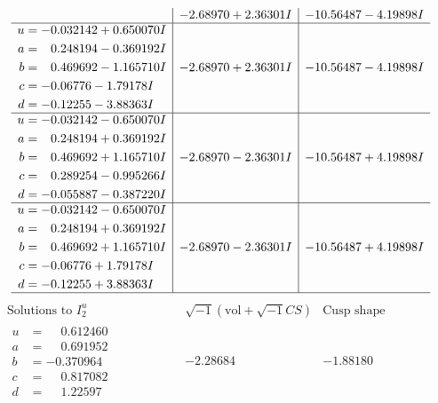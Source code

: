 \documentclass[1p]{elsarticle_modified}
\theoremstyle{definition}
\newcommand{\I}{\sqrt{-1}}
\begin{document}
$$\begin{array}{c|c|c}
 & -2.68970 + 2.36301 I & -10.56487 - 4.19898 I \\ \hline\begin{aligned}
u &= -0.032142 + 0.650070 I \\
a &= \phantom{-}0.248194 - 0.369192 I \\
b &= \phantom{-}0.469692 - 1.165710 I \\
c &= -0.06776 - 1.79178 I \\
d &= -0.12255 - 3.88363 I\end{aligned}
 & -2.68970 + 2.36301 I & -10.56487 - 4.19898 I \\ \hline\begin{aligned}
u &= -0.032142 - 0.650070 I \\
a &= \phantom{-}0.248194 + 0.369192 I \\
b &= \phantom{-}0.469692 + 1.165710 I \\
c &= \phantom{-}0.289254 - 0.995266 I \\
d &= -0.055887 - 0.387220 I\end{aligned}
 & -2.68970 - 2.36301 I & -10.56487 + 4.19898 I \\ \hline\begin{aligned}
u &= -0.032142 - 0.650070 I \\
a &= \phantom{-}0.248194 + 0.369192 I \\
b &= \phantom{-}0.469692 + 1.165710 I \\
c &= -0.06776 + 1.79178 I \\
d &= -0.12255 + 3.88363 I\end{aligned}
 & -2.68970 - 2.36301 I & -10.56487 + 4.19898 I\\
 \hline 
 \end{array}$$\newpage$$\begin{array}{c|c|c}  
\text{Solutions to }I^u_{2}& \I (\text{vol} + \sqrt{-1}CS) & \text{Cusp shape}\\
 \hline 
\begin{aligned}
u &= \phantom{-}0.612460\phantom{ +0.000000I} \\
a &= \phantom{-}0.691952\phantom{ +0.000000I} \\
b &= -0.370964\phantom{ +0.000000I} \\
c &= \phantom{-}0.817082\phantom{ +0.000000I} \\
d &= \phantom{-}1.22597\phantom{ +0.000000I}\end{aligned}
 & -2.28684\phantom{ +0.000000I} & -1.88180\phantom{ +0.000000I} \\ \hline\begin{aligned}

\end{aligned}
\end{array}$$
\end{document}
